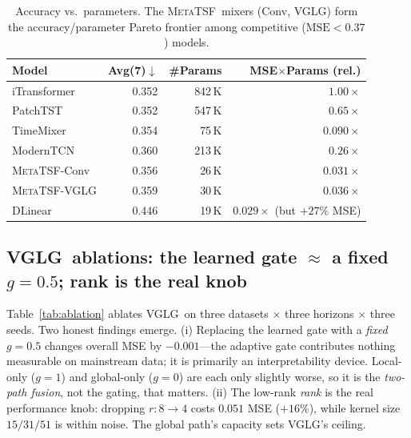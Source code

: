 \documentclass[11pt]{article}
\newcommand{\best}[1]{\textbf{#1}}
\newcommand{\mtsf}{\textsc{MetaTSF}}
\newcommand{\vglg}{\textsc{VGLG}}
\newcommand{\avgseven}{Avg(7)}
\begin{document}
\begin{table}[t]
\centering
\caption{Accuracy vs.\ parameters. The \mtsf\ mixers (Conv, \vglg) form the
accuracy/parameter Pareto frontier among competitive ($\text{MSE}<0.37$) models.}
\label{tab:params}
\small
\begin{tabular}{@{}lrrr@{}}
\toprule
Model & \avgseven $\downarrow$ & \#Params & MSE$\times$Params (rel.) \\
\midrule
iTransformer & 0.352 & 842\,K & $1.00\times$ \\
PatchTST     & 0.352 & 547\,K & $0.65\times$ \\
TimeMixer    & 0.354 & 75\,K  & $0.090\times$ \\
ModernTCN    & 0.360 & 213\,K & $0.26\times$ \\
\mtsf-Conv   & 0.356 & 26\,K  & \best{$0.031\times$} \\
\mtsf-\vglg  & 0.359 & 30\,K  & \best{$0.036\times$} \\
DLinear      & 0.446 & 19\,K  & $0.029\times$ (but $+27\%$ MSE) \\
\bottomrule
\end{tabular}
\end{table}

\subsection{\vglg\ ablations: the learned gate $\approx$ a fixed $g{=}0.5$; rank is the real knob}
\label{sec:ablation}

Table~\ref{tab:ablation} ablates \vglg\ on three datasets $\times$ three horizons
$\times$ three seeds. Two honest findings emerge. (i) Replacing the learned gate
with a \emph{fixed} $g{=}0.5$ changes overall MSE by $-0.001$---the adaptive gate
contributes nothing measurable on mainstream data; it is primarily an
interpretability device. Local-only ($g{=}1$) and global-only ($g{=}0$) are each
only slightly worse, so it is the \emph{two-path fusion}, not the gating, that
matters. (ii) The low-rank \emph{rank} is the real performance knob: dropping
$r{:}8{\to}4$ costs $0.051$ MSE ($+16\%$), while kernel size $15/31/51$ is
within noise. The global path's capacity sets \vglg's ceiling.
\end{document}
